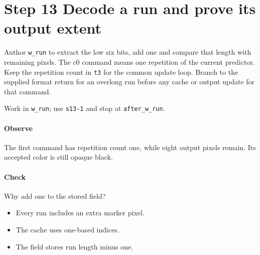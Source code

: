 \section{Step 13 Decode a run and prove its output extent}\label{qoi-s13}
Author \texttt{w\_run} to extract the low six bits, add one and compare that length with remaining pixels. The c0 command means one repetition of the current predictor. Keep the repetition count in \texttt{t3} for the common update loop. Branch to the supplied format return for an overlong run before any cache or output update for that command.

Work in \texttt{w\_run}; use \texttt{s13-1} and stop at \texttt{after\_w\_run}.

\paragraph{Observe} The first command has repetition count one, while eight output pixels remain. Its accepted color is still opaque black.

\paragraph{Check} Why add one to the stored field?
\begin{itemize}
  \item[A.] Every run includes an extra marker pixel.
  \item[B.] The cache uses one-based indices.
  \item[C.] The field stores run length minus one.
\end{itemize}
